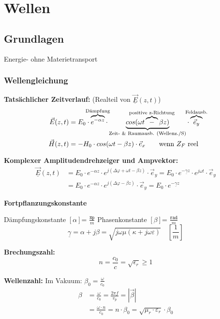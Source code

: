 \section{Wellen}
\subsection{Grundlagen}
Energie- ohne Materietransport

\subsubsection*{Wellengleichung}
\textbf{Tatsächlicher Zeitverlauf:} (Realteil von $\underline{\vec{E}}(z,t)$)
\begin{align*}
    \vec{E}(z,t)
        &= E_0
        \cdot \overbrace{e^{-\alpha z}}^{\mathclap{\text{Dämpfung}}}
        \cdot \underbrace{cos(\omega t \overbrace{-}^{\mathclap{\text{positive z-Richtung}}} \beta z)}_\text{Zeit- \& Raumausb. (Wellenz./S)}
        \cdot \overbrace{\vec{e}_y}^{\mathclap{\text{Feldausb.}}} \\
    \vec{H}(z,t)
        &= - H_0 \cdot cos(\omega t - \beta z) \cdot \vec{e}_x \qquad \text{wenn $Z_F$ reel}
\end{align*}
\vspace{1ex}

\textbf{Komplexer Amplitudendrehzeiger und Ampvektor:}
\begin{align*}
    \underline{\vec{E}}(z,t)
    &= E_0\cdot e^{-\alpha z}\cdot e^{j(\Delta\varphi + \omega t-\beta z)}\cdot\vec{e}_y
    = E_0\cdot e^{-\underline{\gamma}z}\cdot e^{j\omega t}\cdot\vec{e}_y \\
    &= E_0\cdot e^{-\alpha z}\cdot e^{j(\Delta\varphi -\beta z)}\cdot\vec{e}_y
    = E_0\cdot e^{-\underline{\gamma}z}
\end{align*}
\vspace{1ex}

\textbf{Fortpflanzungskonstante}

Dämpfungskonstante $ [\alpha] $= $\frac{\mathtt{Np}}{m}$ \qquad \quad
Phasenkonstante $ [\beta] $= $ \frac{\mathtt{rad}}{m} $
\[\underline{\gamma}=\alpha+j\beta =  \sqrt{j\omega \mu (\kappa + \si{j}\omega \varepsilon)} \quad \left[ \frac{1}{m} \right]\]
 

\textbf{Brechungszahl:}
\[ n = \dfrac{c_0}{c} = \sqrt{\epsilon_r} \geq 1 \]

\textbf{Wellenzahl:}
Im Vakuum: $\beta_{0}=\frac{\omega}{c_{0}}$
\begin{align*}
    \beta & = \frac{\omega}{c_0} = \frac{2 \pi f}{v_p} = |\vec{\beta}|                                                                      \\
      & = \frac{\omega \cdot n}{c_{0}} = n \cdot \beta_{0}=\sqrt{\mu_{r} \cdot \varepsilon_{r}} \cdot \beta_{0}
\end{align*}

